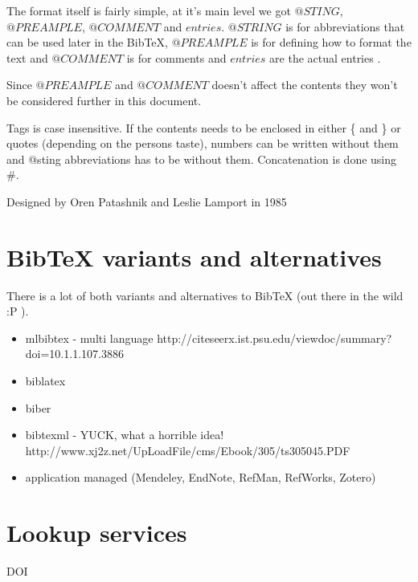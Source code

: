 The format itself is fairly simple, at it's main level we got
$@STING$, $@PREAMPLE$, $@COMMENT$ and $entries$.  $@STRING$ is for
abbreviations that can be used later in the Bib{\TeX}, $@PREAMPLE$ is for
defining how to format the text and $@COMMENT$ is for comments and
$entries$ are the actual entries \autocite{bibtex_resource}.

Since $@PREAMPLE$ and $@COMMENT$ doesn't affect the contents they
won't be considered further in this document. 

Tags is case insensitive. If the contents needs to be enclosed in
either \{ and \} or quotes (depending on the persons taste), numbers
can be written without them and @sting abbreviations has to be without
them. Concatenation is done using \#.\autocite{bibtex_resource}

Designed by Oren Patashnik and Leslie Lamport in 1985




\section{BibTeX variants and alternatives}
There is a lot of both variants and alternatives to BibTeX (out there in the wild :P ).

\begin{itemize}
\item mlbibtex - multi language http://citeseerx.ist.psu.edu/viewdoc/summary?doi=10.1.1.107.3886
\item biblatex
\item biber
\item bibtexml - YUCK, what a horrible idea! http://www.xj2z.net/UpLoadFile/cms/Ebook/305/ts305045.PDF
\item application managed (Mendeley, EndNote, RefMan, RefWorks, Zotero)
\end{itemize}

\section{Lookup services}
DOI


